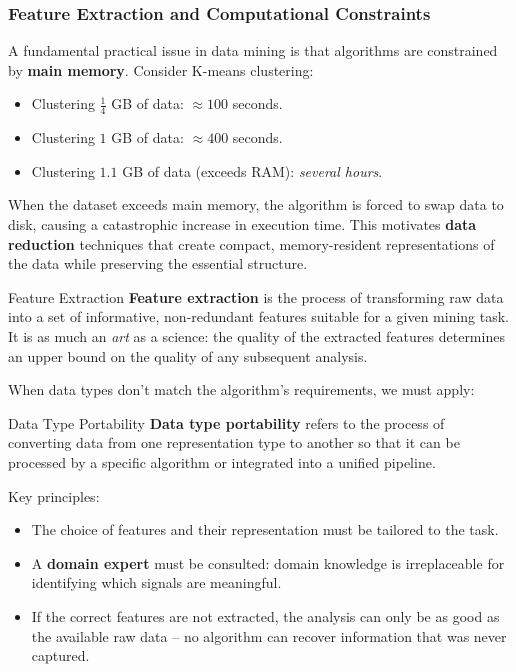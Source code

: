 \documentclass[11pt]{article}
\theoremstyle{smallexample}
\begin{document}
\subsubsection{Feature Extraction and Computational Constraints}

A fundamental practical issue in data mining is that algorithms are constrained by
\textbf{main memory}. Consider K-means clustering:

\begin{itemize}
  \item Clustering $\tfrac{1}{4}$ GB of data: $\approx 100$ seconds.
  \item Clustering $1$ GB of data: $\approx 400$ seconds.
  \item Clustering $1.1$ GB of data (exceeds RAM): \emph{several hours}.
\end{itemize}

\noindent When the dataset exceeds main memory, the algorithm is forced to swap data to disk,
causing a catastrophic increase in execution time. This motivates \textbf{data reduction}
techniques that create compact, memory-resident representations of the data while preserving
the essential structure. 


\begin{defbox}{Feature Extraction}
  \textbf{Feature extraction} is the process of transforming raw data into a set of
  informative, non-redundant features suitable for a given mining task. It is as much an
  \emph{art} as a science: the quality of the extracted features determines an upper bound on
  the quality of any subsequent analysis.
\end{defbox}



When data types don't match the algorithm's requirements, we must apply:

\begin{defbox}{Data Type Portability}
  \textbf{Data type portability} refers to the process of converting data from one
  representation type to another so that it can be processed by a specific algorithm or
  integrated into a unified pipeline.
\end{defbox}

\noindent Key principles:
\begin{itemize}
  \item The choice of features and their representation must be tailored to the task.
  \item A \textbf{domain expert} must be consulted: domain knowledge is irreplaceable for
        identifying which signals are meaningful.
  \item If the correct features are not extracted, the analysis can only be as good as the
        available raw data -- no algorithm can recover information that was never captured.
\end{itemize}
\end{document}
